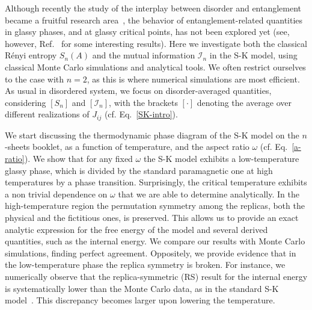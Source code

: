 \documentclass[twocolumn,superscriptaddress,prb,10pt]{revtex4-1}
\begin{document}
Although recently the study of the interplay between disorder and entanglement became a fruitful 
research area~\cite{refael-2009}, the behavior of entanglement-related quantities 
in glassy phases, and at glassy critical points, has not been explored yet (see, however,  
Ref.~ for some interesting results). Here we investigate 
both the classical R\'enyi entropy $S_n(A)$ and the mutual information ${\mathcal I}_n$ 
in the S-K model, using classical Monte Carlo simulations and analytical tools. We often 
restrict ourselves to the case with $n=2$, as this is where numerical simulations are 
most efficient. As usual in disordered system, we focus on disorder-averaged quantities, 
considering $[S_n]$ and $[{\mathcal I}_n]$, with the brackets $[\cdot]$ denoting the 
average over different realizations of $J_{ij}$ (cf. Eq.~\eqref{SK-intro}).

We start discussing the thermodynamic phase diagram of the S-K model on the $n$-sheets 
booklet, as a function of temperature, and the aspect ratio $\omega$ (cf. Eq.~\eqref{a-ratio}). 
We show that for any fixed $\omega$ the S-K model exhibits a low-temperature glassy phase, 
which is divided by the standard paramagnetic one at high temperatures by a phase transition. 
Surprisingly, the critical temperature exhibits a non trivial dependence on $\omega$ 
that we are able to determine analytically. 
In the high-temperature region the permutation symmetry among the replicas, both the 
physical and the fictitious ones, is preserved. This allows us to provide an exact analytic 
expression for the free energy of the model and several derived quantities, such as the internal 
energy. We compare our results with Monte Carlo simulations, finding perfect agreement. 
Oppositely, we provide evidence that in the low-temperature phase the replica symmetry is  
broken. For instance, we numerically observe that the replica-symmetric (RS) result for the 
internal energy is systematically lower than the Monte Carlo data, as in the standard 
S-K model~\cite{sherrington-1978-prl,sherrington-1978}. This discrepancy becomes larger 
upon lowering the temperature.  
\end{document}
